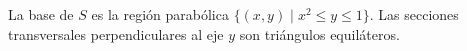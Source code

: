 \item La base de $S$ es la región parabólica $\{(x, y) \mid x^2 \le y \le 1\}$. Las secciones transversales perpendiculares al eje $y$ son triángulos equiláteros.
